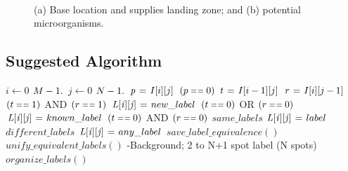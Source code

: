 \documentclass[paper=a4, fontsize=11pt]{scrartcl} %
\numberwithin{equation}{section} %
\numberwithin{figure}{section} %
\numberwithin{table}{section} %
\begin{document}
\begin{figure}
	\centering
	\begin{subfigure}[b]{0.4\textwidth}
		\caption{}
		\label{fig:mars}
	\end{subfigure}
	~ %
	\hspace{3eM}
	\begin{subfigure}[b]{0.4\textwidth}
		\caption{}
		\label{fig:spots}
	\end{subfigure}
	\caption{(a) Base location and supplies landing zone; and (b) potential microorganisms.}\label{fig:animals}
	\label{fig:two}
\end{figure}


\subsection{Suggested Algorithm}


\begin{codebox}
	\li \For $i \gets 0$ \To $\attrib{M-1}{}$
	\li \Do
 	\For $j \gets 0$ \To $\attrib{N-1}{}$
	\li \Do
	$\id{p} \gets I[i][j]$
	\li \If $(p \isequal 0)$
	\Then
	\li $\id{t} \gets I[i-1][j]$
	\li $\id{r} \gets I[i][j-1]$
    \li \If $(t \isequal 1)$ AND $(r \isequal 1)$
    \Then
    \li $\id{L[i][j]} \gets new\_label$
    \li\Else
	\If $(t \isequal 0)$ OR $(r \isequal 0)$
	\Then
	\li $\id{L[i][j]} \gets known\_label$
	\li \Else
	\If $(t \isequal 0)$ AND $(r \isequal 0)$ 
	\Then
	\li\If $same\_labels$
	\Then
	\li $\id{L[i][j]} \gets label$
	\li \Else
	\If $different\_labels$
	\li $\id{L[i][j]} \gets any\_label$
	\li $save\_label\_equivalence()$
	\End
	\End
	\End
	\End
	\End
	\End
	\End
	\li $unify\_equivalent\_labels()$
	\li {}-Background; 2 to N+1 spot label (N spots)
	\li $organize\_labels()$

\end{codebox}
\end{document}
